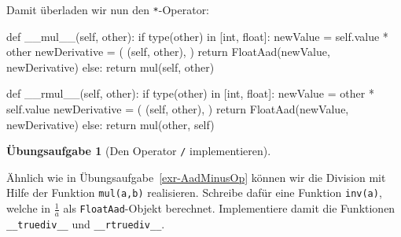 \documentclass[
  a4paper,
  DIV=11]{scrreprt}
\newenvironment{Shaded}{\begin{snugshade}}{\end{snugshade}}
\newcommand{\BuiltInTok}[1]{\textcolor[rgb]{0.00,0.23,0.31}{#1}}
\newcommand{\ControlFlowTok}[1]{\textcolor[rgb]{0.00,0.23,0.31}{#1}}
\newcommand{\FunctionTok}[1]{\textcolor[rgb]{0.28,0.35,0.67}{#1}}
\newcommand{\KeywordTok}[1]{\textcolor[rgb]{0.00,0.23,0.31}{#1}}
\newcommand{\NormalTok}[1]{\textcolor[rgb]{0.00,0.23,0.31}{#1}}
\newcommand{\OperatorTok}[1]{\textcolor[rgb]{0.37,0.37,0.37}{#1}}
\newcommand{\VariableTok}[1]{\textcolor[rgb]{0.07,0.07,0.07}{#1}}
\theoremstyle{definition}
\newtheorem{exercise}{Übungsaufgabe}[chapter]
\theoremstyle{definition}
\theoremstyle{remark}
\begin{document}
Damit überladen wir nun den \texttt{*}-Operator:

\begin{Shaded}
\begin{Highlighting}[]
\KeywordTok{def} \FunctionTok{\_\_mul\_\_}\NormalTok{(}\VariableTok{self}\NormalTok{, other):}
    \ControlFlowTok{if} \BuiltInTok{type}\NormalTok{(other) }\KeywordTok{in}\NormalTok{ [}\BuiltInTok{int}\NormalTok{, }\BuiltInTok{float}\NormalTok{]:}
\NormalTok{        newValue }\OperatorTok{=} \VariableTok{self}\NormalTok{.value }\OperatorTok{*}\NormalTok{ other}
\NormalTok{        newDerivative }\OperatorTok{=}\NormalTok{ (}
\NormalTok{            (}\VariableTok{self}\NormalTok{, other), }
\NormalTok{        )}
        \ControlFlowTok{return}\NormalTok{ FloatAad(newValue, newDerivative)}
    \ControlFlowTok{else}\NormalTok{:}
        \ControlFlowTok{return}\NormalTok{ mul(}\VariableTok{self}\NormalTok{, other)}
        
\KeywordTok{def} \FunctionTok{\_\_rmul\_\_}\NormalTok{(}\VariableTok{self}\NormalTok{, other):}
    \ControlFlowTok{if} \BuiltInTok{type}\NormalTok{(other) }\KeywordTok{in}\NormalTok{ [}\BuiltInTok{int}\NormalTok{, }\BuiltInTok{float}\NormalTok{]:}
\NormalTok{        newValue }\OperatorTok{=}\NormalTok{ other }\OperatorTok{*} \VariableTok{self}\NormalTok{.value}
\NormalTok{        newDerivative }\OperatorTok{=}\NormalTok{ (}
\NormalTok{            (}\VariableTok{self}\NormalTok{, other), }
\NormalTok{        )}
        \ControlFlowTok{return}\NormalTok{ FloatAad(newValue, newDerivative)}
    \ControlFlowTok{else}\NormalTok{:}
        \ControlFlowTok{return}\NormalTok{ mul(other, }\VariableTok{self}\NormalTok{)}
\end{Highlighting}
\end{Shaded}

\begin{exercise}[Den Operator \texttt{/}
implementieren]\protect\hypertarget{exr-AadDivOp}{}\label{exr-AadDivOp}

Ähnlich wie in Übungsaufgabe~\ref{exr-AadMinusOp} können wir die
Division mit Hilfe der Funktion \texttt{mul(a,b)} realisieren. Schreibe
dafür eine Funktion \texttt{inv(a)}, welche in \(\frac{1}{a}\) als
\texttt{FloatAad}-Objekt berechnet. Implementiere damit die Funktionen
\texttt{\_\_truediv\_\_} und \texttt{\_\_rtruediv\_\_}.

\end{exercise}
\end{document}
